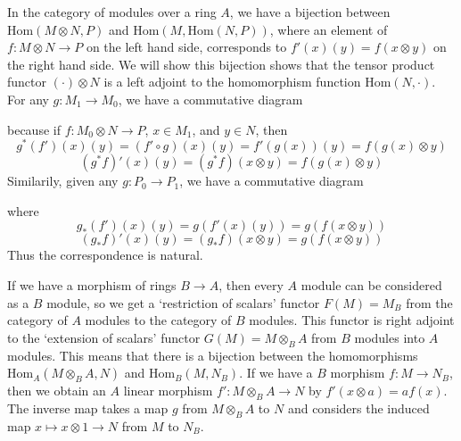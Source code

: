\begin{example}
    In the category of modules over a ring $A$, we have a bijection between $\text{Hom}(M \otimes N, P)$ and $\text{Hom}(M, \text{Hom}(N,P))$, where an element of $f: M \otimes N \to P$ on the left hand side, corresponds to $f'(x)(y) = f(x \otimes y)$ on the right hand side. We will show this bijection shows that the tensor product functor $(\cdot) \otimes N$ is a left adjoint to the homomorphism function $\text{Hom}(N,\cdot)$. For any $g: M_1 \to M_0$, we have a commutative diagram
    \begin{center}
    \end{center}
    because if $f: M_0 \otimes N \to P$, $x \in M_1$, and $y \in N$, then
    \[ g^*(f')(x)(y) = (f' \circ g)(x)(y) = f'(g(x))(y) = f(g(x) \otimes y) \]
    \[ (g^* f)'(x)(y) = (g^* f)(x \otimes y) = f(g(x) \otimes y) \]
    Similarily, given any $g: P_0 \to P_1$, we have a commutative diagram
    \begin{center}
    \end{center}
    where
    \[ g_*(f')(x)(y) = g(f'(x)(y)) = g(f(x \otimes y)) \]
    \[ (g_* f)'(x)(y) = (g_* f)(x \otimes y) = g(f(x \otimes y)) \]
    Thus the correspondence is natural.
\end{example}

\begin{example}
    If we have a morphism of rings $B \to A$, then every $A$ module can be considered as a $B$ module, so we get a `restriction of scalars' functor $F(M) = M_B$ from the category of $A$ modules to the category of $B$ modules. This functor is right adjoint to the `extension of scalars' functor $G(M) = M \otimes_B A$ from $B$ modules into $A$ modules. This means that there is a bijection between the homomorphisms $\text{Hom}_A(M \otimes_B A, N)$ and $\text{Hom}_B(M,N_B)$. If we have a $B$ morphism $f: M \to N_B$, then we obtain an $A$ linear morphism $f': M \otimes_B A \to N$ by $f'(x \otimes a) = af(x)$. The inverse map takes a map $g$ from $M \otimes_B A$ to $N$ and considers the induced map $x \mapsto x \otimes 1 \to N$ from $M$ to $N_B$.
\end{example}


